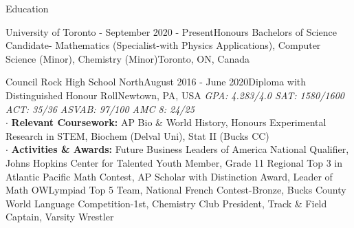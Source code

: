 \documentclass[UTF8]{resume} %
\begin{document}
\begin{rSection}{Education}

\begin{rSubsection}{University of Toronto - }{September 2020 - Present}{Honours Bachelors of Science Candidate- Mathematics (Specialist-with Physics Applications), Computer Science (Minor), Chemistry (Minor)}{Toronto, ON, Canada}
    \end{rSubsection}
\begin{rSubsection}{Council Rock High School North}{August 2016 - June 2020}{Diploma with Distinguished Honour Roll}{Newtown, PA, USA}
  \textit{GPA: 4.283/4.0  SAT: 1580/1600  ACT: 35/36  ASVAB: 97/100  AMC 8: 24/25}\\
    \scriptsize{
    $\cdot$ \textbf{Relevant Coursework:} AP Bio \& World History, Honours Experimental Research in STEM, Biochem (Delval Uni), Stat II (Bucks CC)\\
    $\cdot$ \textbf{Activities \& Awards:} Future Business Leaders of America National Qualifier, Johns Hopkins Center for Talented Youth Member, Grade 11 Regional Top 3 in Atlantic Pacific Math Contest, AP Scholar with Distinction Award, Leader of Math OWLympiad Top 5 Team, National French Contest-Bronze, Bucks County World Language Competition-1st, Chemistry Club President, Track \& Field Captain, Varsity Wrestler}
    \end{rSubsection}
\end{rSection}
\end{document}
